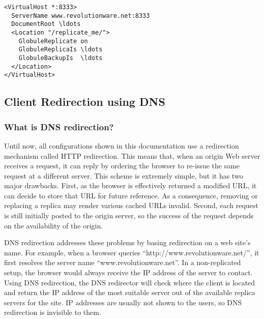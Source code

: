 \documentclass[10pt,a4paper]{article}
\makeatletter
\newenvironment{p}{\@open{P}{}}{\@close{P}}
\newenvironment{p}{}{\par}
\newcommand\subsectionbr{}
\makeatother
\begin{document}
\begin{Verbatim}[label={Replicate only the /replicate\_me/ directory}]
<VirtualHost *:8333>
  ServerName www.revolutionware.net:8333
  DocumentRoot \ldots
  <Location "/replicate_me/">
    GlobuleReplicate on
    GlobuleReplicaIs \ldots
    GlobuleBackupIs  \ldots
  </Location>
</VirtualHost>
\end{Verbatim}


\newpage
\subsection{\label{sec:conf:dnsredir}
  Client Redirection using DNS\subsectionbr}

\subsubsection{What is DNS redirection?}

\begin{p}
Until now, all configurations shown in this documentation use a redirection
mechanism called HTTP redirection. This means that, when an origin Web server
receives a request, it can reply by ordering the browser to re-issue the same
request at a different server. This scheme is extremely simple, but it has two
major drawbacks. First, as the browser is effectively returned a modified URL,
it can decide to store that URL for future reference.  As a consequence,
removing or replacing a replica may render various cached URLs
invalid. Second, each request is still initially posted to the origin server,
so the success of the request depends on the availability of the origin.
\end{p}

\begin{p}
DNS redirection addresses these problems by basing redirection on a web site's
name.  For example, when a browser queries ``http://www.revolutionware.net/'',
it first resolves the server name ``www.revolutionware.net''. In a
non-replicated setup, the browser would always receive the IP address of the
server to contact. Using DNS redirection, the DNS redirector will check where
the client is located and return the IP address of the most suitable server
out of the available replica servers for the site. IP addresses are usually
not shown to the users, so DNS redirection is invisible to them.
\end{p}
\end{document}
